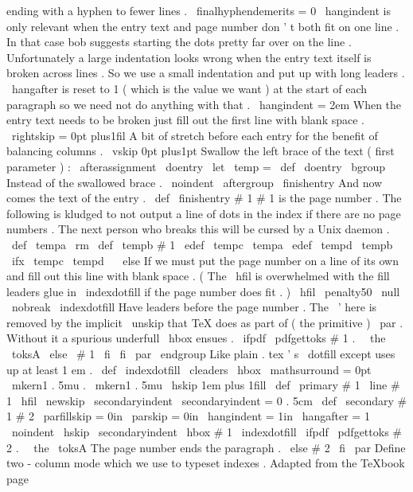 {{{ending
with
a
hyphen
to
fewer
lines
.
\
finalhyphendemerits
=
0
%
%
\
hangindent
is
only
relevant
when
the
entry
text
and
page
number
%
don
'
t
both
fit
on
one
line
.
In
that
case
bob
suggests
starting
the
%
dots
pretty
far
over
on
the
line
.
Unfortunately
a
large
%
indentation
looks
wrong
when
the
entry
text
itself
is
broken
across
%
lines
.
So
we
use
a
small
indentation
and
put
up
with
long
leaders
.
%
%
\
hangafter
is
reset
to
1
(
which
is
the
value
we
want
)
at
the
start
%
of
each
paragraph
so
we
need
not
do
anything
with
that
.
\
hangindent
=
2em
%
%
When
the
entry
text
needs
to
be
broken
just
fill
out
the
first
line
%
with
blank
space
.
\
rightskip
=
0pt
plus1fil
%
%
A
bit
of
stretch
before
each
entry
for
the
benefit
of
balancing
%
columns
.
\
vskip
0pt
plus1pt
%
%
Swallow
the
left
brace
of
the
text
(
first
parameter
)
:
\
afterassignment
\
doentry
\
let
\
temp
=
}
\
def
\
doentry
{
%
\
bgroup
%
Instead
of
the
swallowed
brace
.
\
noindent
\
aftergroup
\
finishentry
%
And
now
comes
the
text
of
the
entry
.
}
\
def
\
finishentry
#
1
{
%
%
#
1
is
the
page
number
.
%
%
The
following
is
kludged
to
not
output
a
line
of
dots
in
the
index
if
%
there
are
no
page
numbers
.
The
next
person
who
breaks
this
will
be
%
cursed
by
a
Unix
daemon
.
\
def
\
tempa
{
{
\
rm
}
}
%
\
def
\
tempb
{
#
1
}
%
\
edef
\
tempc
{
\
tempa
}
%
\
edef
\
tempd
{
\
tempb
}
%
\
ifx
\
tempc
\
tempd
\
%
\
else
%
%
If
we
must
put
the
page
number
on
a
line
of
its
own
and
fill
out
%
this
line
with
blank
space
.
(
The
\
hfil
is
overwhelmed
with
the
%
fill
leaders
glue
in
\
indexdotfill
if
the
page
number
does
fit
.
)
\
hfil
\
penalty50
\
null
\
nobreak
\
indexdotfill
%
Have
leaders
before
the
page
number
.
%
%
The
\
'
here
is
removed
by
the
implicit
\
unskip
that
TeX
does
as
%
part
of
(
the
primitive
)
\
par
.
Without
it
a
spurious
underfull
%
\
hbox
ensues
.
\
ifpdf
\
pdfgettoks
#
1
.
%
\
\
the
\
toksA
\
else
\
#
1
%
\
fi
\
fi
\
par
\
endgroup
}
%
Like
plain
.
tex
'
s
\
dotfill
except
uses
up
at
least
1
em
.
\
def
\
indexdotfill
{
\
cleaders
\
hbox
{
\
mathsurround
=
0pt
\
mkern1
.
5mu
.
\
mkern1
.
5mu
}
\
hskip
1em
plus
1fill
}
\
def
\
primary
#
1
{
\
line
{
#
1
\
hfil
}
}
\
newskip
\
secondaryindent
\
secondaryindent
=
0
.
5cm
\
def
\
secondary
#
1
#
2
{
{
%
\
parfillskip
=
0in
\
parskip
=
0in
\
hangindent
=
1in
\
hangafter
=
1
\
noindent
\
hskip
\
secondaryindent
\
hbox
{
#
1
}
\
indexdotfill
\
ifpdf
\
pdfgettoks
#
2
.
\
\
the
\
toksA
%
The
page
number
ends
the
paragraph
.
\
else
#
2
\
fi
\
par
}
}
%
Define
two
-
column
mode
which
we
use
to
typeset
indexes
.
%
Adapted
from
the
TeXbook
page
}}
